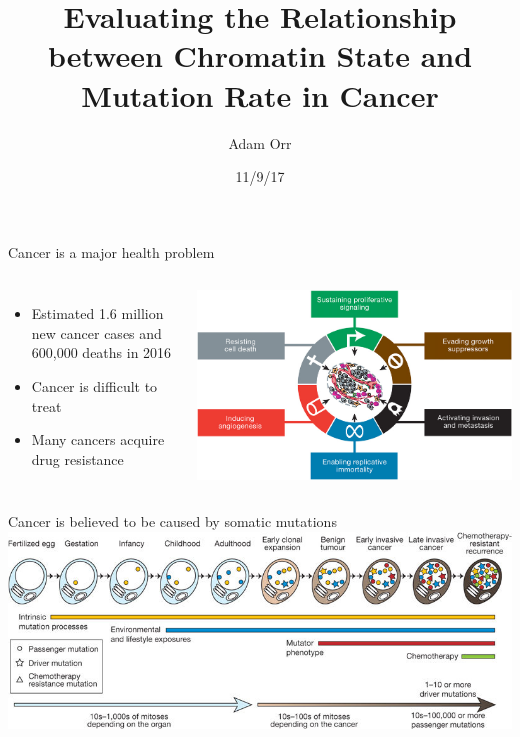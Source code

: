\documentclass{beamer}
\title[Chromatin and Mutation]{Evaluating the Relationship between Chromatin State and Mutation Rate in Cancer}
\date{11/9/17}
\author{Adam Orr}
\begin{document}
\frame{\titlepage}

\begin{frame}{Cancer is a major health problem}
\begin{columns}
\begin{itemize}
\item Estimated 1.6 million new cancer cases and 600,000 deaths in 2016 \footnotemark
\item Cancer is difficult to treat
\item Many cancers acquire drug resistance \parencite{holohan_cancer_2013}
\end{itemize}
\includegraphics[width=\linewidth]{hanahan_2011_hallmarks.png}\footnotemark
\end{columns}
\end{frame}

\begin{frame}{Cancer is believed to be caused by somatic mutations}
\includegraphics[width=\linewidth]{stratton_2009_mutations.jpg}
\end{frame}
\end{document}
